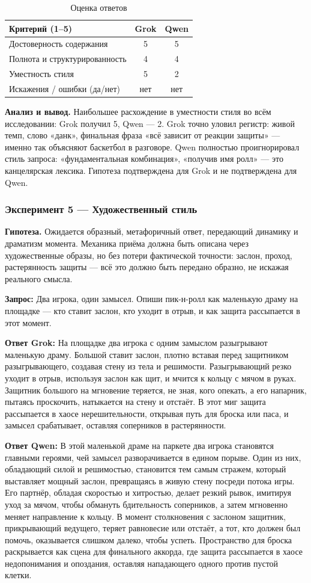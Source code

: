 \documentclass[a4paper, final]{article}
\newcommand{\scoretablefilled}[8]{%
    \vspace{4pt}
    \begin{table}[h!]
    \centering
    \small
    \begin{tabular}{|l|c|c|}
    \hline
    \textbf{Критерий (1--5)} & \textbf{Grok} & \textbf{Qwen} \\
    \hline
    Достоверность содержания & #1 & #2 \\
    \hline
    Полнота и структурированность & #3 & #4 \\
    \hline
    Уместность стиля & #5 & #6 \\
    \hline
    Искажения / ошибки (да/нет) & #7 & #8 \\
    \hline
    \end{tabular}
    \caption{Оценка ответов}
    \end{table}
    \vspace{2pt}
}
\begin{document}
\scoretablefilled{5}{5}{4}{4}{5}{2}{нет}{нет}

\noindent\textbf{Анализ и вывод.} Наибольшее расхождение в уместности стиля во всём исследовании: Grok получил 5, Qwen — 2. Grok точно уловил регистр: живой темп, слово «данк», финальная фраза «всё зависит от реакции защиты» — именно так объясняют баскетбол в разговоре. Qwen полностью проигнорировал стиль запроса: «фундаментальная комбинация», «получив имя ролл» — это канцелярская лексика. Гипотеза подтверждена для Grok и не подтверждена для Qwen.

\newpage

\subsubsection{Эксперимент 5 — Художественный стиль}

\noindent\textbf{Гипотеза.} Ожидается образный, метафоричный ответ, передающий динамику и драматизм момента. Механика приёма должна быть описана через художественные образы, но без потери фактической точности: заслон, проход, растерянность защиты — всё это должно быть передано образно, не искажая реального смысла.

\noindent\textbf{Запрос:} Два игрока, один замысел. Опиши пик-н-ролл как маленькую драму на площадке — кто ставит заслон, кто уходит в отрыв, и как защита рассыпается в этот момент.

\noindent\textbf{Ответ Grok:} На площадке два игрока с одним замыслом разыгрывают маленькую драму. Большой ставит заслон, плотно вставая перед защитником разыгрывающего, создавая стену из тела и решимости. Разыгрывающий резко уходит в отрыв, используя заслон как щит, и мчится к кольцу с мячом в руках. Защитник большого на мгновение теряется, не зная, кого опекать, а его напарник, пытаясь проскочить, натыкается на стену и отстаёт. В этот миг защита рассыпается в хаосе нерешительности, открывая путь для броска или паса, и замысел срабатывает, оставляя соперников в растерянности.

\noindent\textbf{Ответ Qwen:} В этой маленькой драме на паркете два игрока становятся главными героями, чей замысел разворачивается в едином порыве. Один из них, обладающий силой и решимостью, становится тем самым стражем, который выставляет мощный заслон, превращаясь в живую стену посреди потока игры. Его партнёр, обладая скоростью и хитростью, делает резкий рывок, имитируя уход за мячом, чтобы обмануть бдительность соперников, а затем мгновенно меняет направление к кольцу. В момент столкновения с заслоном защитник, прикрывающий ведущего, теряет равновесие или отстаёт, а тот, кто должен был помочь, оказывается слишком далеко, чтобы успеть. Пространство для броска раскрывается как сцена для финального аккорда, где защита рассыпается в хаосе недопонимания и опоздания, оставляя нападающего одного против пустой клетки.
\end{document}
